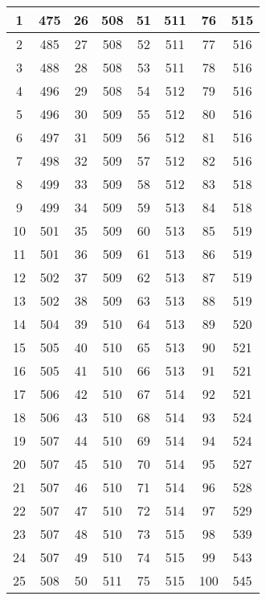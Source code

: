 \begin{center}
\begin{longtable}{|c|c|c|c|c|c|c|c|}
		1  & 475 & 26 & 508 & 51 & 511 & 76  & 515 \\ \hline
		2  & 485 & 27 & 508 & 52 & 511 & 77  & 516 \\ \hline
		3  & 488 & 28 & 508 & 53 & 511 & 78  & 516 \\ \hline
		4  & 496 & 29 & 508 & 54 & 512 & 79  & 516 \\ \hline
		5  & 496 & 30 & 509 & 55 & 512 & 80  & 516 \\ \hline
		6  & 497 & 31 & 509 & 56 & 512 & 81  & 516 \\ \hline
		7  & 498 & 32 & 509 & 57 & 512 & 82  & 516 \\ \hline
		8  & 499 & 33 & 509 & 58 & 512 & 83  & 518 \\ \hline
		9  & 499 & 34 & 509 & 59 & 513 & 84  & 518 \\ \hline
		10 & 501 & 35 & 509 & 60 & 513 & 85  & 519 \\ \hline
		11 & 501 & 36 & 509 & 61 & 513 & 86  & 519 \\ \hline
		12 & 502 & 37 & 509 & 62 & 513 & 87  & 519 \\ \hline
		13 & 502 & 38 & 509 & 63 & 513 & 88  & 519 \\ \hline
		14 & 504 & 39 & 510 & 64 & 513 & 89  & 520 \\ \hline
		15 & 505 & 40 & 510 & 65 & 513 & 90  & 521 \\ \hline
		16 & 505 & 41 & 510 & 66 & 513 & 91  & 521 \\ \hline
		17 & 506 & 42 & 510 & 67 & 514 & 92  & 521 \\ \hline
		18 & 506 & 43 & 510 & 68 & 514 & 93  & 524 \\ \hline
		19 & 507 & 44 & 510 & 69 & 514 & 94  & 524 \\ \hline
		20 & 507 & 45 & 510 & 70 & 514 & 95  & 527 \\ \hline
		21 & 507 & 46 & 510 & 71 & 514 & 96  & 528 \\ \hline
		22 & 507 & 47 & 510 & 72 & 514 & 97  & 529 \\ \hline
		23 & 507 & 48 & 510 & 73 & 515 & 98  & 539 \\ \hline
		24 & 507 & 49 & 510 & 74 & 515 & 99  & 543 \\ \hline
		25 & 508 & 50 & 511 & 75 & 515 & 100 & 545 \\ \hline
	\end{longtable}
\end{center}


